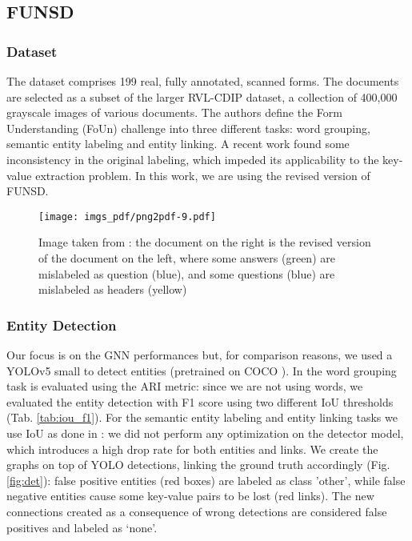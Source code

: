 \documentclass[runningheads]{llncs}
\begin{document}
\subsection{FUNSD}
\subsubsection{Dataset}
The dataset\cite{FUNSD} comprises 199 real, fully annotated, scanned forms. The documents are selected as a subset of the larger RVL-CDIP\cite{RVL-CDIP} dataset, a collection of 400,000 grayscale images of various documents. The authors define the Form Understanding (FoUn) challenge into three different tasks: word grouping, semantic entity labeling and entity linking.
A recent work \cite{revised-FUNSD} found some inconsistency in the original labeling, which impeded its applicability to the key-value extraction problem. In this work, we are using the revised version of FUNSD.
\begin{figure}[!b]
    \centering
    \texttt{[image: imgs\_pdf/png2pdf-9.pdf]}
    \caption{Image taken from \cite{revised-FUNSD}: the document on the right is the revised version of the document on the left, where some answers (green) are mislabeled as question (blue), and some questions (blue) are mislabeled as headers (yellow)}
    \label{fig:revised-funsd}
\end{figure}

\subsubsection{Entity Detection}
Our focus is on the GNN performances but, for comparison reasons, we used a YOLOv5 small \cite{YOLOv5} to detect entities (pretrained on COCO \cite{lin2014microsoft}). In \cite{FUNSD} the word grouping task is evaluated using the ARI metric: since we are not using words, we evaluated the entity detection with F1 score using two different IoU thresholds (Tab. \ref{tab:iou_f1}). For the semantic entity labeling and entity linking tasks we use IoU  as done in \cite{davis2021visual}: we did not perform any optimization on the detector model, which introduces a high drop rate for both entities and links. We create the graphs on top of YOLO detections, linking the ground truth accordingly (Fig. \ref{fig:det}): false positive entities (red boxes) are labeled as class 'other', while false negative entities cause some key-value pairs to be lost (red links). The new connections created as a consequence of wrong detections are considered false positives and labeled as `none'. 
\end{document}

